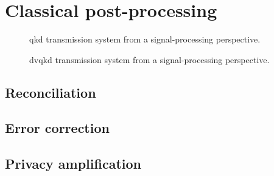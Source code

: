 \section{Classical post-processing}



\begin{figure}[htb]
	\centering
	
	\caption{\Gls{qkd} transmission system from a signal-processing perspective.}
\end{figure}

\begin{figure}[htb]
	\centering
	
	\caption{\Gls{dvqkd} transmission system from a signal-processing perspective.}
\end{figure}

\subsection{Reconciliation}


\subsection{Error correction}


\subsection{Privacy amplification}


